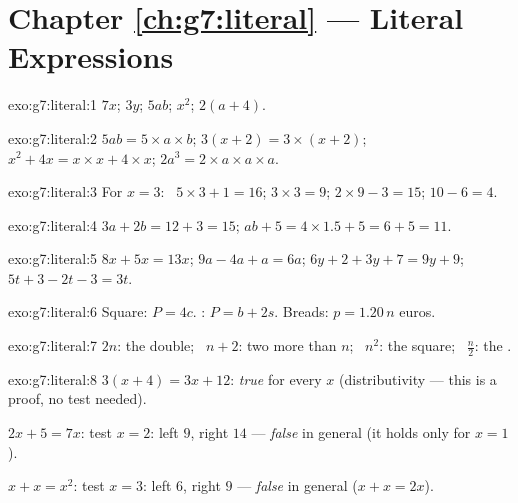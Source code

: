 \section*{Chapter \ref{ch:g7:literal} --- Literal Expressions}

\begin{solution}{exo:g7:literal:1}
$7x$; \quad $3y$; \quad $5ab$; \quad $x^2$; \quad $2(a + 4)$.
\end{solution}

\begin{solution}{exo:g7:literal:2}
$5ab = 5 \times a \times b$; \quad
$3(x+2) = 3 \times (x + 2)$; \quad
$x^2 + 4x = x \times x + 4 \times x$; \quad
$2a^3 = 2 \times a \times a \times a$.
\end{solution}

\begin{solution}{exo:g7:literal:3}
For $x = 3$: \ $5 \times 3 + 1 = 16$; \quad $3 \times 3 = 9$; \quad
$2 \times 9 - 3 = 15$; \quad $10 - 6 = 4$.
\end{solution}

\begin{solution}{exo:g7:literal:4}
$3a + 2b = 12 + 3 = 15$; \qquad
$ab + 5 = 4 \times 1.5 + 5 = 6 + 5 = 11$.
\end{solution}

\begin{solution}{exo:g7:literal:5}
$8x + 5x = 13x$; \quad
$9a - 4a + a = 6a$; \quad
$6y + 2 + 3y + 7 = 9y + 9$; \quad
$5t + 3 - 2t - 3 = 3t$.
\end{solution}

\begin{solution}{exo:g7:literal:6}
Square: $P = 4c$. : $P = b + 2s$. Breads:
$p = 1.20\,n$ euros.
\end{solution}

\begin{solution}{exo:g7:literal:7}
$2n$: the double; \ $n + 2$: two more than $n$; \ $n^2$: the square;
\ $\frac n2$: the .
\end{solution}

\begin{solution}{exo:g7:literal:8}
$3(x+4) = 3x + 12$: \emph{true} for every $x$ (distributivity ---
this is a proof, no test needed).

$2x + 5 = 7x$: test $x = 2$: left $9$, right $14$ --- \emph{false} in
general (it holds only for $x = 1$).

$x + x = x^2$: test $x = 3$: left $6$, right $9$ --- \emph{false} in
general ($x + x = 2x$).
\end{solution}

